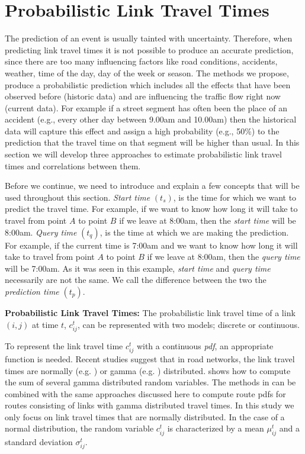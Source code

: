 \section{Probabilistic Link Travel Times}
\label{sec:lttestimation} 
The prediction of an event is usually tainted with uncertainty. Therefore, when predicting link travel times it is not possible to produce an accurate prediction, since there are too many influencing factors like road conditions, accidents, weather, time of the day, day of the week or season. The methods we propose, produce a probabilistic prediction which includes all the effects that have been observed before (historic data) and are influencing the traffic flow right now (current data). For example if a street segment has often been the place of an accident (e.g., every other day between 9.00am and 10.00am) then the historical data will capture this effect and assign a high probability (e.g., 50\%) to the prediction that the travel time on that segment will be higher than usual. In this section we will develop three approaches to estimate probabilistic link travel times and correlations between them.

Before we continue, we need to introduce and explain a few concepts that will be used throughout this section. \textit{Start time} $(t_s)$, is the time for which we want to predict the travel time. For example, if we want to know how long it will take to travel from point $A$ to point $B$ if we leave at 8:00am, then the \textit{start time} will be 8:00am. \textit{Query time} $(t_q)$, is the time at which we are making the prediction. For example, if the current time is 7:00am and we want to know how long it will take to travel from point $A$ to point $B$ if we leave at 8:00am, then the \textit{query time} will be 7:00am. As it was seen in this example, \textit{start time} and \textit{query time} necessarily are not the same. We call the difference between the two the \textit{prediction time} $(t_p)$.

\textbf{Probabilistic Link Travel Times: } The probabilistic link travel time of a link $(i,j)$ at time $t$, $c_{ij}^t$, can be represented with two models; discrete or continuous.

To represent the link travel time $c_{ij}^t$ with a continuous \textit{pdf}, an appropriate function is needed. Recent studies suggest that in road networks, the link travel times are normally (e.g. \cite{Seshadri10}) or gamma (e.g. \cite{Zockaei13}) distributed. \cite{Moschopoulos85} shows how to compute the sum of several gamma distributed random variables. The methods in \cite{Moschopoulos85} can be combined with the same approaches discussed here to compute route pdfs for routes consisting of links with gamma distributed travel times. In this study we only focus on link travel times that are normally distributed. In the case of a normal distribution, the random variable $c_{ij}^t$ is characterized by a mean $\mu_{ij}^t$ and a standard deviation $\sigma_{ij}^t$.

